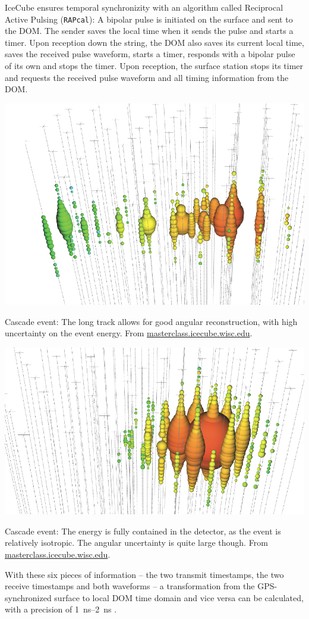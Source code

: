 \documentclass[
    a4paper, %
    fontsize=10pt, %
    twoside=false, %
    numbers=noenddot, %
    fontmethod=tex,
]{kaobook}
\begin{document}
IceCube ensures temporal synchronizity with an algorithm called Reciprocal Active Pulsing (\texttt{RAPcal}): A bipolar pulse is initiated on the surface and sent to the DOM. The sender saves the local time when it sends the pulse and starts a timer. Upon reception down the string, the DOM also saves its current local time, saves the received pulse waveform, starts a timer, responds with a bipolar pulse of its own and stops the timer. Upon reception, the surface station stops its timer and requests the received pulse waveform and all timing information from the DOM.
\begin{marginfigure}
    \includegraphics{ic/ic_track.png}
    \caption[Track event in IceCube]{Cascade event: The long track allows for good angular reconstruction, with high uncertainty on the event energy. From \url{masterclass.icecube.wisc.edu}.}
\end{marginfigure}
\begin{marginfigure}
    \includegraphics{ic/ic_cascade.png}
    \caption[Cascade event in IceCube]{Cascade event: The energy is fully contained in the detector, as the event is relatively isotropic. The angular uncertainty is quite large though. From \url{masterclass.icecube.wisc.edu}.}
\end{marginfigure}
With these six pieces of information -- the two transmit timestamps, the two receive timestamps and both waveforms -- a transformation from the GPS-synchronized surface to local DOM time domain and vice versa can be calculated, with a precision of \SIrange{1}{2}{\ns} \cite{Abbasi2009}.
\end{document}

